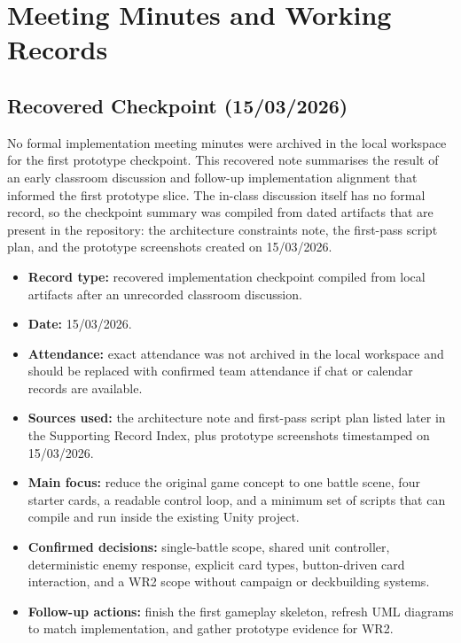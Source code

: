\appendix

\chapter{Meeting Minutes and Working Records}

\section{Recovered Checkpoint (15/03/2026)}

No formal implementation meeting minutes were archived in the local workspace for the first prototype checkpoint. This recovered note summarises the result of an early classroom discussion and follow-up implementation alignment that informed the first prototype slice. The in-class discussion itself has no formal record, so the checkpoint summary was compiled from dated artifacts that are present in the repository: the architecture constraints note, the first-pass script plan, and the prototype screenshots created on 15/03/2026.

\begin{itemize}
\item \textbf{Record type:} recovered implementation checkpoint compiled from local artifacts after an unrecorded classroom discussion.
\item \textbf{Date:} 15/03/2026.
\item \textbf{Attendance:} exact attendance was not archived in the local workspace and should be replaced with confirmed team attendance if chat or calendar records are available.
\item \textbf{Sources used:} the architecture note and first-pass script plan listed later in the Supporting Record Index, plus prototype screenshots timestamped on 15/03/2026.
\item \textbf{Main focus:} reduce the original game concept to one battle scene, four starter cards, a readable control loop, and a minimum set of scripts that can compile and run inside the existing Unity project.
\item \textbf{Confirmed decisions:} single-battle scope, shared unit controller, deterministic enemy response, explicit card types, button-driven card interaction, and a WR2 scope without campaign or deckbuilding systems.
\item \textbf{Follow-up actions:} finish the first gameplay skeleton, refresh UML diagrams to match implementation, and gather prototype evidence for WR2.
\end{itemize}

